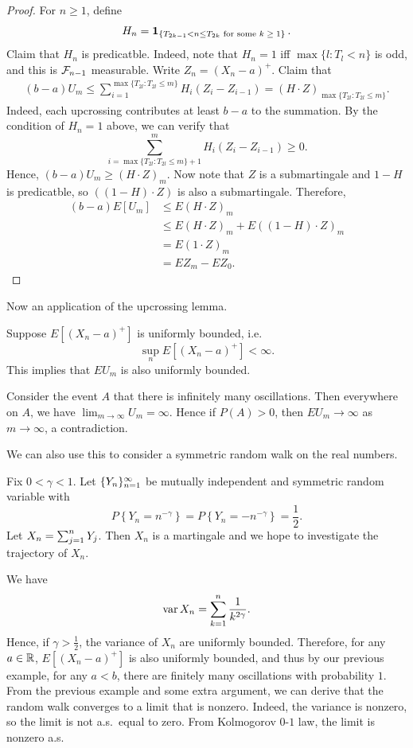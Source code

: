 \documentclass[a4paper]{article}
\begin{document}
\begin{proof}
  For $n \geq 1$, define 
  \[
    H_n = \operatorname{\mathbf{1}}_{\{T_{2k-1} < n \leq T_{2k} \text{ for some $k \geq 1$}\}}.
  \]
  Claim that $H_n$ is predicatble. Indeed, note that 
  $H_n = 1$ iff $\max \{l : T_l < n\}$ is odd, and this is 
  $\mathcal{F}_{n - 1}$ measurable. Write $Z_n = (X_n - a)^+$. 
  Claim that 
  \begin{align*}
    (b - a) U_m 
    \leq \sum_{i=1}^{\max \{T_{2l} : T_{2l} \leq m\}}
    H_i (Z_i - Z_{i - 1})
    = (H \cdot Z)_{\max \{T_{2l} : T_{2l} \leq m\}}.
  \end{align*}
  Indeed, each upcrossing contributes at least $b - a$ to the summation.
  By the condition of $H_n = 1$ above, we can verify that
  \[
  \sum_{i = \max \{T_{2l} : T_{2l} \leq m\} + 1}^m H_i (Z_i - Z_{i - 1}) \geq 0.
  \]
  Hence, $(b - a) U_m \geq (H \cdot Z)_m$. Now note that $Z$ is a 
  submartingale and $1 - H$ is predicatble, so 
  $((1 - H) \cdot Z)$ is also a submartingale. Therefore,
  \begin{align*}
    (b - a) E[U_m] 
    &\leq E (H \cdot Z)_m \\
    &\leq E (H \cdot Z)_m + E ((1 - H) \cdot Z)_m \\
    &= E (1 \cdot Z)_m \\
    &= E Z_m - E Z_0. 
  \end{align*}
\end{proof}

Now an application of the upcrossing lemma.

\begin{eg}
  Suppose $E [(X_n - a)^+]$ is uniformly bounded, i.e.\ 
  \[
  \sup_n E [(X_n - a)^+] < \infty.
  \]
  This implies that $E U_m$ is also uniformly bounded.

  Consider the event $A$ that there is infinitely many oscillations.
  Then everywhere on $A$, we have $\lim_{m \to \infty} U_m = \infty$.
  Hence if $P(A) > 0$, then $E U_m \to \infty$ as $m \to \infty$, a 
  contradiction. 
\end{eg}

We can also use this to consider a symmetric random walk on 
the real numbers.

\begin{eg}
  Fix $0 < \gamma < 1$. 
  Let $\{ Y_n \}_{n=1}^\infty$ be mutually independent and symmetric
  random variable with 
  \[
  P \left\{ Y_n = n^{-\gamma} \right\}
  = P \left\{ Y_n = - n^{-\gamma} \right\}
  = \frac{1}{2}.
  \]
  Let $X_n = \sum_{j=1}^n Y_j$. Then $X_n$ is a martingale and 
  we hope to investigate the trajectory of $X_n$. 

  We have 
  \[
  \operatorname{var} X_n = \sum_{k=1}^n \frac{1}{k^{2 \gamma}}.
  \]
  Hence, if $\gamma > \frac{1}{2}$, the variance of $X_n$ are 
  uniformly bounded. Therefore, for any $a \in \mathbb{R}$, 
  $E [(X_n - a)^+]$ is also uniformly bounded, and thus 
  by our previous example, for any $a < b$, 
  there are finitely many oscillations with probability $1$.
  From the previous example and some extra argument, 
  we can derive that the random walk converges to a limit that is nonzero.
  Indeed, the variance is nonzero, so the limit is not a.s.\ equal to zero.
  From Kolmogorov $0$-$1$ law, the limit is nonzero a.s.
\end{eg}
\end{document}
